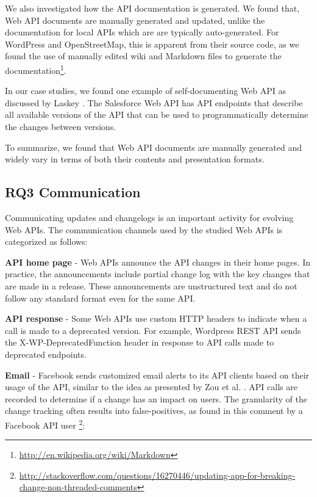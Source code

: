 \documentclass[conference]{IEEEtran}
\begin{document}
We also investigated how the API documentation is generated. We found that, Web API documents are manually generated and updated, unlike the documentation for local APIs which are are typically auto-generated. For WordPress and OpenStreetMap, this is apparent from their source code, as we found the use of manually edited wiki and Markdown files to generate the documentation\footnote{\url{http://en.wikipedia.org/wiki/Markdown}}.

In our case studies, we found one example of self-documenting Web API as discussed by Laskey \cite{laskey2008considerations}. The Salesforce Web API has API endpoints that describe all available versions of the API that can be used to programmatically determine the changes between versions.

To summarize, we found that Web API documents are manually generated and widely vary in terms of both their contents and presentation formats.

\subsection{RQ3 Communication} %
\label{sub:communication}

Communicating updates and changelogs is an important activity for evolving Web APIs. The communication channels used by the studied Web APIs is categorized as follows:


  \textbf{API home page} - Web APIs announce the API changes in their home pages. In practice, the announcements include partial change log with the key changes that are made in a release. These announcements are unstructured text and do not follow any standard format even for the same API.

  \textbf{API response} - Some Web APIs use custom HTTP headers to indicate when a call is made to a deprecated version. For example, Wordpress REST API sends the X-WP-DeprecatedFunction header in response to API calls made to deprecated endpoints.

  \textbf{Email} - Facebook sends customized email alerts to its API clients based on their usage of the API, similar to the idea as presented by Zou et al. \cite{le2008synchronizing}. API calls are recorded to determine if a change has an impact on users. The granularity of the change tracking often results into false-positives, as found in this comment by a Facebook API user \footnote{\url{http://stackoverflow.com/questions/16270446/updating-app-for-breaking-change-non-threaded-comments}}:
\end{document}
